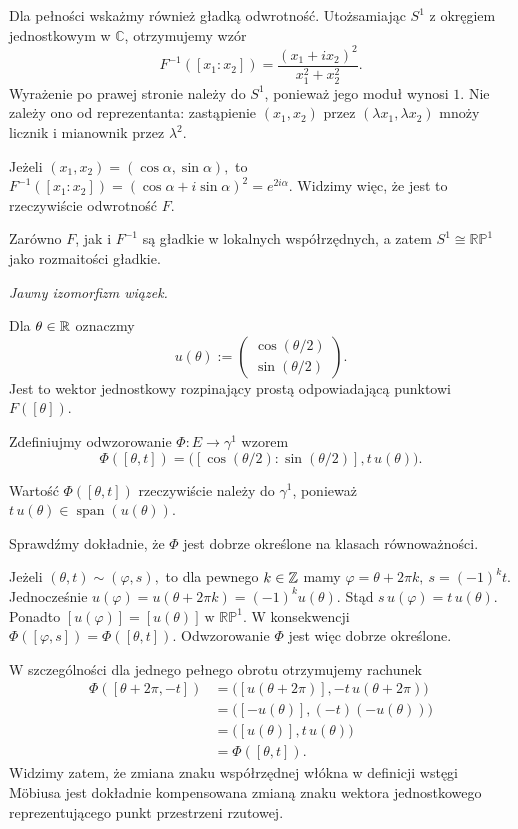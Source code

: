 \begin{przyklad}
Dla pełności wskażmy również gładką
odwrotność. Utożsamiając $S^1$
z okręgiem jednostkowym w $\mathbb C$,
otrzymujemy wzór
\[
\boxed{
F^{-1}([x_1:x_2])
=
\frac{(x_1+ix_2)^2}{x_1^2+x_2^2}.
}
\]
Wyrażenie po prawej stronie należy do $S^1$,
ponieważ jego moduł wynosi $1$.
Nie zależy ono od reprezentanta:
zastąpienie $(x_1,x_2)$ przez
$(\lambda x_1,\lambda x_2)$ mnoży
licznik i mianownik przez $\lambda^2$.

Jeżeli
$
(x_1,x_2)=(\cos\alpha,\sin\alpha),
$
to
$
F^{-1}([x_1:x_2])
=(\cos\alpha+i\sin\alpha)^2
=e^{2i\alpha}.
$
Widzimy więc, że jest to rzeczywiście
odwrotność $F$.

Zarówno $F$, jak i $F^{-1}$
są gładkie w lokalnych współrzędnych,
a zatem
$
S^1\cong\mathbb{RP}^1
$
jako rozmaitości gładkie.

\medskip
\emph{Jawny izomorfizm wiązek.}

Dla $\theta\in\mathbb{R}$ oznaczmy
\[
u(\theta)
:=
\begin{pmatrix}
\cos(\theta/2)\\
\sin(\theta/2)
\end{pmatrix}.
\]
Jest to wektor jednostkowy rozpinający
prostą odpowiadającą punktowi $F([\theta])$.

Zdefiniujmy odwzorowanie
$
\Phi\colon E\longrightarrow\gamma^1
$
wzorem
\[
\Phi([\theta,t])
=
\bigl(
[\cos(\theta/2):\sin(\theta/2)],
t\,u(\theta)
\bigr).
\]

Wartość $\Phi([\theta,t])$ rzeczywiście
należy do $\gamma^1$, ponieważ
$
t\,u(\theta)
\in\operatorname{span}(u(\theta)).
$

Sprawdźmy dokładnie, że $\Phi$
jest dobrze określone na klasach równoważności.

Jeżeli
$
(\theta,t)\sim(\varphi,s),
$
to dla pewnego $k\in\mathbb{Z}$ mamy
$
\varphi=\theta+2\pi k,
\ 
s=(-1)^k t.
$
Jednocześnie
$
u(\varphi)
=
u(\theta+2\pi k)
=
(-1)^k u(\theta).
$
Stąd
$
s\,u(\varphi)=t\,u(\theta).
$
Ponadto
$
[u(\varphi)]=[u(\theta)]
\ \text{w }\mathbb{RP}^1.
$
W konsekwencji
$
\Phi([\varphi,s])=\Phi([\theta,t]).
$
Odwzorowanie $\Phi$ jest więc
dobrze określone.

W szczególności dla jednego pełnego obrotu
otrzymujemy rachunek
\[
\begin{aligned}
\Phi([\theta+2\pi,-t])
&=
\bigl([u(\theta+2\pi)],-t\,u(\theta+2\pi)\bigr)\\
&=
\bigl([-u(\theta)],(-t)(-u(\theta))\bigr)\\
&=
\bigl([u(\theta)],t\,u(\theta)\bigr)\\
&=\Phi([\theta,t]).
\end{aligned}
\]
Widzimy zatem, że zmiana znaku
współrzędnej włókna w definicji wstęgi Möbiusa
jest dokładnie kompensowana zmianą znaku
wektora jednostkowego reprezentującego
punkt przestrzeni rzutowej.


\end{przyklad}
